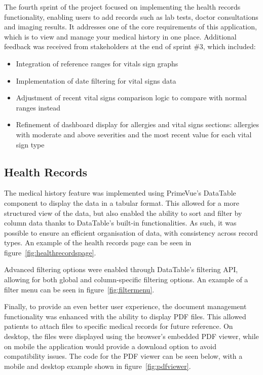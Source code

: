 The fourth sprint of the project focused on implementing the health records functionality, enabling users to add records such as lab tests, doctor consultations and imaging results. It addresses one of the core requirements of this application, which is to view and manage your medical history in one place. Additional feedback was received from stakeholders at the end of sprint \#3, which included:

\begin{itemize}
    \item Integration of reference ranges for vitals sign graphs
    \item Implementation of date filtering for vital signs data
    \item Adjustment of recent vital signs comparison logic to compare with normal ranges instead
    \item Refinement of dashboard display for allergies and vital signs sections: allergies with moderate and above severities and the most recent value for each vital sign type
\end{itemize}

\subsection{Health Records}

The medical history feature was implemented using PrimeVue's DataTable component to display the data in a tabular format. This allowed for a more structured view of the data, but also enabled the ability to sort and filter by column data thanks to DataTable's built-in functionalities. As such, it was possible to ensure an efficient organisation of data, with consistency across record types. 
An example of the health records page can be seen in figure~\ref{fig:healthrecordspage}.

Advanced filtering options were enabled through DataTable's filtering API, allowing for both global and column-specific filtering options. An example of a filter menu can be seen in figure~\ref{fig:filtermenu}.

Finally, to provide an even better user experience, the document management functionality was enhanced with the ability to display PDF files. This allowed patients to attach files to specific medical records for future reference. On desktop, the files were displayed using the browser's embedded PDF viewer, while on mobile the application would provide a download option to avoid compatibility issues. The code for the PDF viewer can be seen below, with a mobile and desktop example shown in figure~\ref{fig:pdfviewer}.

